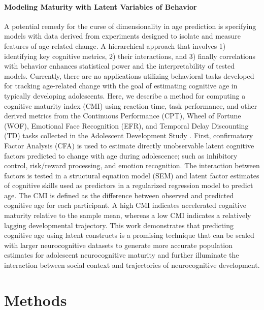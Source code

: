 \documentclass{article}%
\begin{document}
\paragraph*{Modeling Maturity with Latent Variables of Behavior} A potential remedy for the curse of dimensionality in age prediction is specifying models with data derived from experiments designed to isolate and measure features of age-related change. A hierarchical approach that involves 1) identifying key cognitive metrics, 2) their interactions, and 3) finally correlations with behavior enhances statistical power and the interpretability of tested models. Currently, there are no applications utilizing behavioral tasks developed for tracking age-related change with the goal of estimating cognitive age in typically developing adolescents. Here, we describe a method for computing a cognitive maturity index (CMI) using reaction time, task performance, and other derived metrics from the Continuous Performance (CPT), Wheel of Fortune (WOF), Emotional Face Recognition (EFR), and Temporal Delay Discounting (TD) tasks collected in the Adolescent Development Study \citep{Fishbein2016}. First, confirmatory Factor Analysis (CFA) is used to estimate directly unobservable latent cognitive factors predicted to change with age during adolescence; such as inhibitory control, risk/reward processing, and emotion recognition. The interaction between factors is tested in a structural equation model (SEM) and latent factor estimates of cognitive skills used as predictors in a regularized regression model to predict age. The CMI is defined as the difference between observed and predicted cognitive age for each participant. A high CMI indicates accelerated cognitive maturity relative to the sample mean, whereas a low CMI indicates a relatively lagging developmental trajectory. This work demonstrates that predicting cognitive age using latent constructs is a promising technique that can be scaled with larger neurocognitive datasets to generate more accurate population estimates for adolescent neurocognitive maturity and further illuminate the interaction between social context and trajectories of neurocognitive development. 
\section*{Methods}
\end{document}
